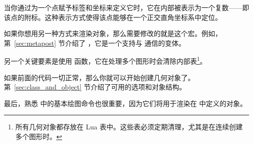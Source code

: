 当你通过为一个点赋予标签和坐标来定义它时，它在内部被表示为一个复数——即该点的附标。这种表示方式使得该点能够在一个正交直角坐标系中定位。

如果你想用另一种方式来渲染对象，那么需要修改的就是这个宏。例如，第~\ref{sec:metapost} 节介绍了 ，它是一个支持与  通信的变体。

另一个关键要素是使用  函数，它在处理多个图形时会清除内部表\footnote{所有几何对象都存放在 Lua 表中。这些表必须定期清理，尤其是在连续创建多个图形时。}。

如果前面的代码一切正常，那么你就可以开始创建几何对象了。第~\ref{sec:class_and_object} 节介绍了可用的选项和对象结构。

最后，熟悉  中的基本绘图命令也很重要，因为它们将用于渲染在  中定义的对象。
\endinput
